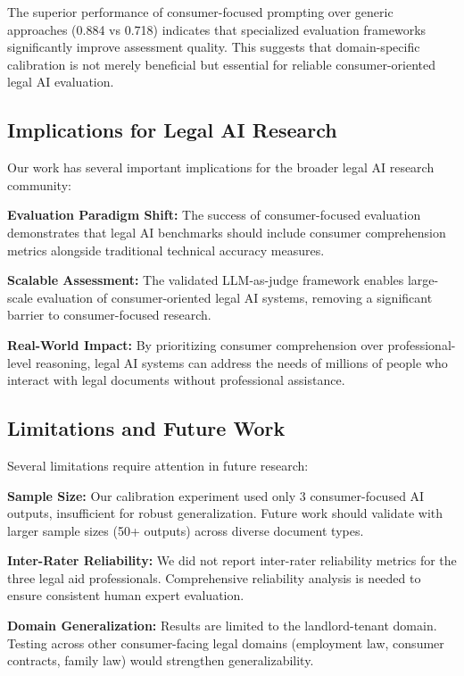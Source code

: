 \documentclass{article}
\begin{document}
The superior performance of consumer-focused prompting over generic approaches (0.884 vs 0.718) indicates that specialized evaluation frameworks significantly improve assessment quality. This suggests that domain-specific calibration is not merely beneficial but essential for reliable consumer-oriented legal AI evaluation.

\subsection{Implications for Legal AI Research}

Our work has several important implications for the broader legal AI research community:

\textbf{Evaluation Paradigm Shift:} The success of consumer-focused evaluation demonstrates that legal AI benchmarks should include consumer comprehension metrics alongside traditional technical accuracy measures.

\textbf{Scalable Assessment:} The validated LLM-as-judge framework enables large-scale evaluation of consumer-oriented legal AI systems, removing a significant barrier to consumer-focused research.

\textbf{Real-World Impact:} By prioritizing consumer comprehension over professional-level reasoning, legal AI systems can address the needs of millions of people who interact with legal documents without professional assistance.

\subsection{Limitations and Future Work}

Several limitations require attention in future research:

\textbf{Sample Size:} Our calibration experiment used only 3 consumer-focused AI outputs, insufficient for robust generalization. Future work should validate with larger sample sizes (50+ outputs) across diverse document types.

\textbf{Inter-Rater Reliability:} We did not report inter-rater reliability metrics for the three legal aid professionals. Comprehensive reliability analysis is needed to ensure consistent human expert evaluation.

\textbf{Domain Generalization:} Results are limited to the landlord-tenant domain. Testing across other consumer-facing legal domains (employment law, consumer contracts, family law) would strengthen generalizability.
\end{document}
